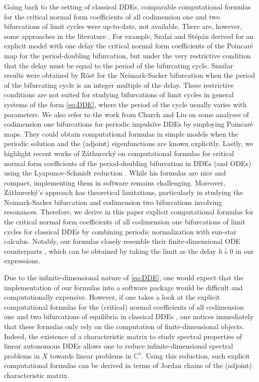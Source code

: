 \documentclass[english]{myarticle}
\begin{document}
\begin{sloppypar}
Going back to the setting of classical DDEs, comparable computational formulas for the critical normal form coefficients of all codimension one and two bifurcations of limit cycles were up-to-date, not available. There are, however, some approaches in the literature \cite[Section 3.2]{Qesmi2018}. For example, Szalai and St\'ep\'an \cite{Szalai2010} derived for an explicit model with one delay the critical normal form coefficients of the Poincar\'e map for the period-doubling bifurcation, but under the very restrictive condition that the delay must be equal to the period of the bifurcating cycle. Similar results were obtained by R\"ost \cite{Roest2005,Roestproceedings,Roest2006} for the Neimark-Sacker bifurcation when the period of the bifurcating cycle is an integer multiple of the delay. These restrictive conditions are not suited for studying bifurcations of limit cycles in general systems of the form \eqref{eq:DDE}, where the period of the cycle usually varies with parameters. We also refer to the work from Church and Liu \cite{Church2018,Church2019,Church2021,Church2020} on some analyses of codimension one bifurcations for periodic impulsive DDEs by employing Poincar\'e maps. They could obtain computational formulas in simple models when the periodic solution and the (adjoint) eigenfunctions are known explicitly. Lastly, we highlight recent works of Z\'athureck\'y \cite{Zathurecky2023,Zathurecky2023a} on computational formulas for critical normal form coefficients of the period-doubling bifurcation in DDEs (and ODEs) using the Lyapunov-Schmidt reduction \cite{Golubitsky1985}. While his formulas are nice and compact, implementing them in software remains challenging. Moreover, Z\'athureck\'y's approach has theoretical limitations, particularly in studying the Neimark-Sacker bifurcation and codimension two bifurcations involving resonances. Therefore, we derive in this paper explicit computational formulas for the critical normal form coefficients of all codimension one bifurcations of limit cycles for classical DDEs by combining periodic normalization with sun-star calculus. Notably, our formulas closely resemble their finite-dimensional ODE counterparts \cite{Kuznetsov2005,Witte2014,Witte2013,Kuznetsov2023a}, which can be obtained by taking the limit as the delay $h \downarrow 0$ in our expressions.

Due to the infinite-dimensional nature of \eqref{eq:DDE}, one would expect that the implementation of our formulas into a software package would be difficult and computationally expensive. However, if one takes a look at the explicit computational formulas for the (critical) normal coefficients of all codimension one and two bifurcations of equilibria in classical DDEs \cite{Bosschaert2020,Bosschaert2024a,Janssens2010}, one notices immediately that these formulas only rely on the computation of finite-dimensional objects. Indeed, the existence of a characteristic matrix \cite{Kaashoek1992,Diekmann1995,Kaashoek2022} to study spectral properties of linear autonomous DDEs allows one to reduce infinite-dimensional spectral problems in $X$ towards linear problems in $\mathbb{C}^n$. Using this reduction, such explicit computational formulas can be derived in terms of Jordan chains of the (adjoint) characteristic matrix.


\end{sloppypar}
\end{document}
